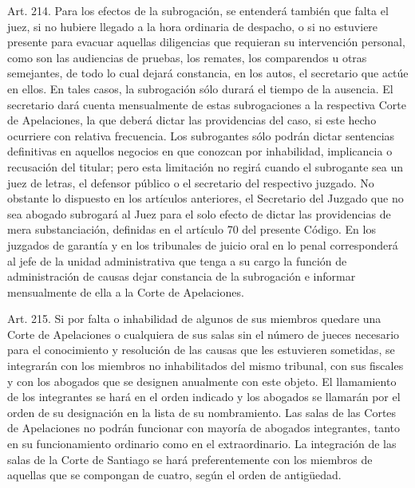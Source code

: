     Art. 214. Para los efectos de la subrogación, se entenderá también que falta el juez, si no hubiere llegado a la hora ordinaria de despacho, o si no estuviere presente para evacuar aquellas diligencias que requieran su intervención personal, como son las audiencias de pruebas, los remates, los comparendos u otras semejantes, de todo lo cual dejará constancia, en los autos, el secretario que actúe en ellos.
    En tales casos, la subrogación sólo durará el tiempo de la ausencia.
    El secretario dará cuenta mensualmente de estas subrogaciones a la respectiva Corte de Apelaciones, la que deberá dictar las providencias del caso, si este hecho ocurriere con relativa frecuencia.
    Los subrogantes sólo podrán dictar sentencias definitivas en aquellos negocios en que conozcan por inhabilidad, implicancia o recusación del titular; pero esta limitación no regirá cuando el subrogante sea un juez de letras, el defensor público o el secretario del respectivo juzgado.
    No obstante lo dispuesto en los artículos anteriores, el Secretario del Juzgado que no sea abogado subrogará al Juez para el solo efecto de dictar las providencias de mera substanciación, definidas en el artículo 70 del presente Código.
    En los juzgados de garantía y en los tribunales de juicio oral en lo penal corresponderá al jefe de la unidad administrativa que tenga a su cargo la función de administración de causas dejar constancia de la subrogación e informar mensualmente de ella a la Corte de Apelaciones.



    Art. 215. Si por falta o inhabilidad de algunos de sus miembros quedare una Corte de Apelaciones o cualquiera de sus salas sin el número de jueces necesario para el conocimiento y resolución de las causas que les estuvieren sometidas, se integrarán con los miembros no inhabilitados del mismo tribunal, con sus fiscales y con los abogados que se designen anualmente con este objeto.
    El llamamiento de los integrantes se hará en el orden indicado y los abogados se llamarán por el orden de su designación en la lista de su nombramiento.
    Las salas de las Cortes de Apelaciones no podrán funcionar con mayoría de abogados integrantes, tanto en su funcionamiento ordinario como en el extraordinario.
    La integración de las salas de la Corte de Santiago se hará preferentemente con los miembros de aquellas que se compongan de cuatro, según el orden de antigüedad.



